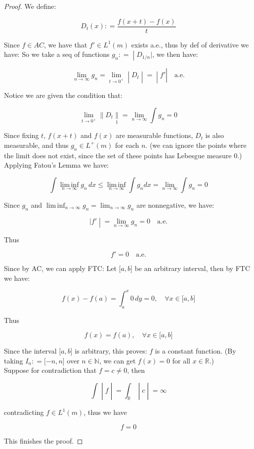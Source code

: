 \begin{proof}

We define:

\[D_{t}(x): = \frac{f(x + t) - f(x)}{t}\]

Since \(f \in AC\), we have that \(f' \in L^{1}(m)\) exists a.e., thus by def of derivative we have: So we take a seq of functions \(\left. g_{n}: = \middle| D_{1/n}| \right.\), we then have:

\[\left. \lim\limits_{n\rightarrow\infty}g_{n} = \lim\limits_{t\rightarrow 0^{+}} \middle| D_{t} \middle| = \middle| f' \right|\quad\text{a.e.}\]

Notice we are given the condition that:

\[\lim\limits_{t\rightarrow 0^{+}} \parallel D_{t}\underset{1}{\parallel} = \lim\limits_{n\rightarrow\infty}\int g_{n} = 0\]

Since fixing \(t\), \(f(x + t)\) and \(f(x)\) are measurable functions, \(D_{t}\) is also measurable, and thus \(g_{n} \in L^{+}(m)\) for each \(n\). (we can ignore the points where the limit does not exist, since the set of these points has Lebesgue measure \(0\).)\\
Applying Fatou's Lemma we have:

\[\int\operatorname{lim\, inf}\limits_{n\rightarrow\infty}g_{n}\, dx \leq \operatorname{lim\, inf}\limits_{n\rightarrow\infty}\int g_{n}dx = \lim\limits_{n\rightarrow\infty}\int g_{n} = 0\]

Since \(g_{n}\) and \(\operatorname{lim\, inf}_{n\rightarrow\infty}g_{n} = \lim_{n\rightarrow\infty}g_{n}\) are nonnegative, we have:

\[\left. |f' \middle| = \lim\limits_{n\rightarrow\infty}g_{n} = 0\quad\text{a.e.} \right.\]

Thus

\[f' = 0\quad\text{a.e.}\]

Since by AC, we can apply FTC: Let \(\lbrack a,b\rbrack\) be an arbitrary interval, then by FTC we have:

\[f(x) - f(a) = \int_{a}^{x}0\, dy = 0,\quad\forall x \in \lbrack a,b\rbrack\]

Thus

\[f(x) = f(a),\quad\forall x \in \lbrack a,b\rbrack\]

Since the interval \(\lbrack a,b\rbrack\) is arbitrary, this proves: \(f\) is a constant function. (By taking \(I_{n}: = \lbrack - n,n\rbrack\) over \(n \in \mathbb{N}\), we can get \(f(x) = 0\) for all \(x \in \mathbb{R}\).)\\
Suppose for contradiction that \(f = c \neq 0\), then

\[\left. \int \middle| f \middle| = \int_{\mathbb{R}} \middle| c \middle| = \infty \right.\]

contradicting \(f \in L^{1}(m)\), thus we have

\[f = 0\]

This finishes the proof.

\end{proof}
